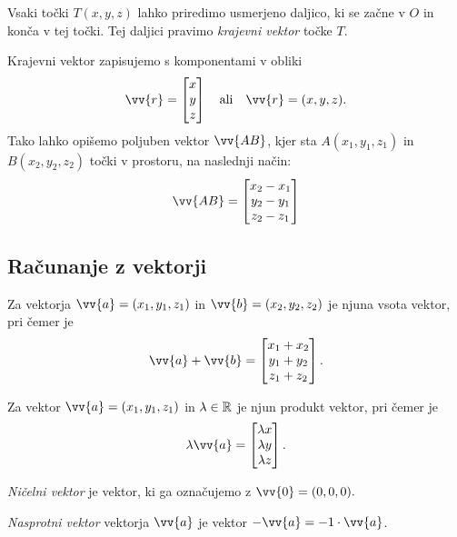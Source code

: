 \documentclass[12pt, a4paper]{article}
\begin{document}
Vsaki točki $T(x,y,z)$ lahko priredimo usmerjeno daljico, ki se začne v $O$ in konča v tej točki. Tej daljici pravimo \emph{krajevni vektor} točke $T$.

Krajevni vektor zapisujemo s komponentami v obliki
\[
\vv{r}=
\begin{bmatrix}
x \\
y \\
z
\end{bmatrix}
\quad\text{ali}\quad
\vv{r}=(x,y,z).
\]
Tako lahko opišemo poljuben vektor $\vv{AB}$, kjer sta $A(x_1,y_1,z_1)$ in $B(x_2,y_2,z_2)$ točki v prostoru, na naslednji način:
\[
\vv{AB}=
\begin{bmatrix}
x_2-x_1 \\
y_2-y_1 \\
z_2-z_1
\end{bmatrix}
\]

\newpage

\subsection{Računanje z vektorji}

\begin{definicija}
Za vektorja $\vv{a}=(x_1,y_1,z_1)$ in $\vv{b}=(x_2,y_2,z_2)$  je njuna vsota vektor, pri čemer je
\[
\vv{a}+\vv{b}=
\begin{bmatrix}
x_1+x_2 \\
y_1+y_2 \\
z_1+z_2
\end{bmatrix}.
\]
\end{definicija}

\begin{definicija}
Za vektor $\vv{a}=(x_1,y_1,z_1)$ in $\lambda\in\mathbb{R}$ je njun produkt vektor, pri čemer je
\[\lambda\vv{a}=
\begin{bmatrix}
\lambda x \\
\lambda y \\
\lambda z
\end{bmatrix}.
\]
\end{definicija}

\begin{definicija}
\emph{Ničelni vektor} je vektor, ki ga označujemo z $\vv{0}=(0,0,0).$
\end{definicija}

\begin{definicija}
\emph{Nasprotni vektor} vektorja $\vv{a}$ je vektor $-\vv{a}=-1\cdot\vv{a}$.
\end{definicija}
\end{document}
